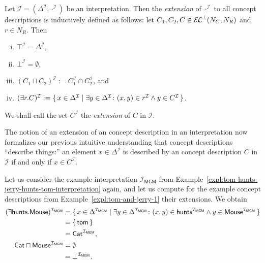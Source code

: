\begin{Definition}
  \label{def:extending-the-interpretation-function}
  Let $\mathcal{I} = (\Delta^{\mathcal{I}}, \cdot^{\mathcal{I}})$ be an interpretation.
  Then the \emph{extension} of $\cdot^{\mathcal{I}}$ to all \ELbot concept descriptions is
  inductively defined as follows: let $C_1, C_2, C \in {\ensuremath{{\mathcal{E}\kern-.3ex\mathcal{L}}^\bot}}(N_C, N_R)$ and $r \in N_R$.
  Then
  \begin{enumerate}[i. ]
  \item $\top^{\mathcal{I}} = \Delta^{\mathcal{I}}$,
  \item $\bot^{\mathcal{I}} = \emptyset$,
  \item $(C_1 \sqcap C_2)^{\mathcal{I}} := C_1^{\mathcal{I}} \cap C_2^{\mathcal{I}}$, and
  \item $(\exists r. C)^{\mathcal{I}} := {\{\, x \in \Delta^{\mathcal{I}} \mid \exists y
      \in \Delta^{\mathcal{I}} \colon (x, y) \in r^{\mathcal{I}} \land y \in C^{\mathcal{I}} \,\}}$.
  \end{enumerate}
  We shall call the set $C^{\mathcal{I}}$ the \emph{extension} of $C$ in $\mathcal{I}$.
\end{Definition}

The notion of an extension of an \ELbot concept description in an interpretation now
formalizes our previous intuitive understanding that concept descriptions ``describe
things:'' an element $x \in \Delta^{\mathcal{I}}$ is described by an \ELbot concept
description $C$ in $\mathcal{I}$ if and only if $x \in C^{\mathcal{I}}$.

\begin{Example}
  \label{expl:tom-and-jerry-2}
  Let us consider the example interpretation $\mathcal{I}_{\mathsf{MGM}}$ from
  Example~\ref{expl:tom-hunts-jerry-hunts-tom-interpretation} again, and let us compute
  for the example \ELbot concept descriptions from Example~\ref{expl:tom-and-jerry-1}
  their extensions.  We obtain
  \begin{align*}
    (\mathsf{\exists hunts. Mouse})^{\mathcal{I}_{\mathsf{MGM}}} &= {\{\, x \in
      \Delta^{\mathcal{I}_{\mathsf{MGM}}} \mid \exists y \in
      \Delta^{\mathcal{I}_{\mathsf{MGM}}} \colon (x, y) \in
      \mathsf{hunts}^{\mathcal{I}_{\mathsf{MGM}}} \land y \in
      \mathsf{Mouse}^{\mathcal{I}_{\mathsf{MGM}}} \,\}}\\
    &= {\{\, \mathsf{tom} \,\}} \\
    &= \mathsf{Cat}^{\mathcal{I}_{\mathsf{MGM}}},\\
    \mathsf{Cat \sqcap Mouse}^{\mathcal{I}_{\mathsf{MGM}}} &= \emptyset \\
    &= \bot^{\mathcal{I}_{\mathsf{MGM}}}.
  \end{align*}
\end{Example}

